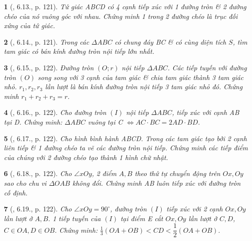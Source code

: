 \documentclass{article}
\newtheorem{baitoan}{}
\begin{document}
\begin{baitoan}[\cite{Binh_boi_duong_Toan_9_tap_1}, 6.13., p. 121]
	Tứ giác ABCD có 4 cạnh tiếp xúc với 1 đường tròn \& 2 đường chéo của nó vuông góc với nhau. Chứng minh 1 trong 2 đường chéo là trục đối xứng của tứ giác.
\end{baitoan}

\begin{baitoan}[\cite{Binh_boi_duong_Toan_9_tap_1}, 6.14., p. 121]
	Trong các $\Delta ABC$ có chung đáy BC \& có cùng diện tích $S$, tìm tam giác có bán kính đường tròn nội tiếp lớn nhất.
\end{baitoan}

\begin{baitoan}[\cite{Binh_boi_duong_Toan_9_tap_1}, 6.15., p. 122]
	Đường tròn $(O;r)$ nội tiếp $\Delta ABC$. Các tiếp tuyến với đường tròn $(O)$ song song với 3 cạnh của tam giác \& chia tam giác thành 3 tam giác nhỏ. $r_1,r_2,r_3$ lần lượt là bán kính đường tròn nội tiếp 3 tam giác nhỏ đó. Chứng minh $r_1 + r_2 + r_3 = r$.
\end{baitoan}

\begin{baitoan}[\cite{Binh_boi_duong_Toan_9_tap_1}, 6.16., p. 122]
	Cho đường tròn $(I)$ nội tiếp $\Delta ABC$, tiếp xúc với cạnh AB tại D. Chứng minh: $\Delta ABC$ vuông tại C $\Leftrightarrow AC\cdot BC = 2AD\cdot BD$.
\end{baitoan}

\begin{baitoan}[\cite{Binh_boi_duong_Toan_9_tap_1}, 6.17., p. 122]
	Cho hình bình hành ABCD. Trong các tam giác tạo bởi 2 cạnh liên tiếp \& 1 đường chéo ta vẽ các đường tròn nội tiếp. Chứng minh các tiếp điểm của chúng với 2 đường chéo tạo thành 1 hình chữ nhật.
\end{baitoan}

\begin{baitoan}[\cite{Binh_boi_duong_Toan_9_tap_1}, 6.18., p. 122]
	Cho $\angle{xOy}$, 2 điểm $A,B$ theo thứ tự chuyển động trên $Ox,Oy$ sao cho chu vi $\Delta OAB$ không đổi. Chứng minh AB luôn tiếp xúc với đường tròn cố định.
\end{baitoan}

\begin{baitoan}[\cite{Binh_boi_duong_Toan_9_tap_1}, 6.19., p. 122]
	Cho $\angle{xOy} = 90^\circ$, đường tròn $(I)$ tiếp xúc với 2 cạnh $Ox,Oy$ lần lượt ở $A,B$. 1 tiếp tuyến của $(I)$ tại điểm E cắt $Ox,Oy$ lần lượt ở $C,D$, $C\in OA,D\in OB$. Chứng minh: $\frac{1}{3}(OA + OB) < CD < \dfrac{1}{2}(OA + OB)$.
\end{baitoan}
\end{document}
